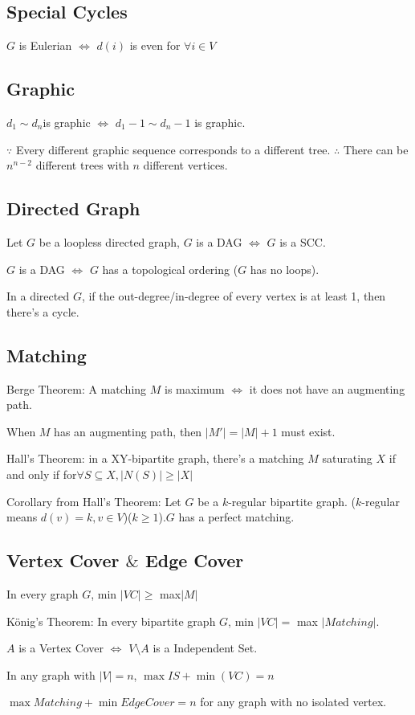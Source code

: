 \documentclass[12pt,a4paper]{ctexrep}
\begin{document}
\subsection{Special Cycles}
$G$ is Eulerian $\iff$ $d(i)$ is even for $\forall i \in V$
\subsection{Graphic}
$d_{1} \sim d_{n}$is graphic $\iff$ $d_{1}-1 \sim d_{n}-1$ is graphic.

$\because$ Every different graphic sequence corresponds to a different tree. $\therefore$ There can be $n^{n-2}$ different trees with $n$ different vertices.
\subsection{Directed Graph}
Let $G$ be a loopless directed graph, $G$ is a DAG $\iff$ $G$ is a SCC.

$G$ is a DAG $\iff$ $G$ has a topological ordering ($G$ has no loops).

In a directed $G$, if the out-degree/in-degree of every vertex is at least 1, then there's a cycle.
\subsection{Matching}
Berge Theorem: A matching $M$ is maximum $\iff$ it does not have an augmenting path.

When $M$ has an augmenting path, then $|M'| = |M|+1$ must exist.

Hall's Theorem: in a XY-bipartite graph, there's a matching $M$ saturating $X$ if and only if for$\forall S \subseteq X, |N(S)|\geq |X|$

Corollary from Hall's Theorem: Let $G$ be a $k$-regular bipartite graph. ($k$-regular means $d(v) = k,v\in V$)($k\geq 1$).$G$ has a perfect matching.
\subsection{Vertex Cover $\&$ Edge Cover}
In every graph $G$, min $|VC| \geq$ max$|M|$

K\"{o}nig's Theorem: In every bipartite graph $G$, min $|VC|=$ max $|Matching|$.

$A$ is a Vertex Cover $\iff$ $V \setminus A$ is a Independent Set.

In any graph with $|V|=n$, $\max{IS}+\min(VC)=n$

$\max{Matching}+\min{Edge Cover}=n$ for any graph with no isolated vertex.
\end{document}

